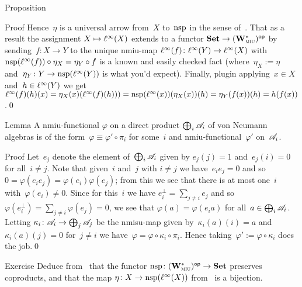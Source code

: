 \documentclass[a]{subfiles}
\begin{document}
\begin{parsec}
\begin{point}{Proposition}
\begin{point}{Proof}
Hence~$\eta$ is a universal arrow from~$X$
to~$\mathrm{nsp}$ in the sense of~.
That as a result the assignment $X\mapsto \ell^\infty(X)$
extends to a functor
$\mathbf{Set}\to{(\mathbf{W}^*_{\text{\textsc{miu}}})}{^{\mathsf{op}}}$
by sending~$f\colon X\to Y$
to the unique nmiu-map $\ell^\infty(f)\colon \ell^\infty(Y)\to\ell^\infty(X)$
with $\mathrm{nsp}(\ell^\infty(f))\circ \eta_X = \eta_Y\circ f$
is a known and easily checked fact
(where~$\eta_X:= \eta$ and~$\eta_Y\colon Y\to\mathrm{nsp}(\ell^\infty(Y))$ 
is what you'd expect).
Finally, plugin applying~$x\in X$ and~$h\in \ell^\infty(Y)$
we get
$ \ell^\infty(f)(h)(x)
= \eta_X(x)(\ell^\infty(f)(h)))
=\mathrm{nsp}(\ell^\infty(x))(\eta_X(x))(h)
=\eta_Y(f(x))(h)
=h(f(x))$.\qed
\end{point}
\end{point}
\begin{point}{Lemma}%
A nmiu-functional $\varphi$
on a direct product $\bigoplus_i \mathscr{A}_i$
of von Neumann algebras
is of the form~$\varphi\equiv \varphi'\circ \pi_i$
for some~$i$ and nmiu-functional~$\varphi'$ on~$\mathscr{A}_i$.
\begin{point}{Proof}%
Let~$e_j$ denote the element of~$\bigoplus_i \mathscr{A}_i$
given by $e_j(j)=1$ and~$e_j(i)=0$ for all~$i\neq j$.
Note that given~$i$ and~$j$ with $i\neq j$
we have~$e_ie_j=0$
and so~$0=\varphi(e_i e_j)=\varphi(e_i)\varphi(e_j)$;
from this we see that
there is at most one~$i$ with~$\varphi(e_i)\neq 0$.
Since for this~$i$
we have $e_i^\perp = \sum_{j\neq i} e_j$
and so~$\varphi(e_i^\perp)=\sum_{j\neq i} \varphi(e_j)=0$,
we see that $\varphi(a)=\varphi(e_i a )$
for all~$a\in \bigoplus_i \mathscr{A}_i$.
Letting  $\kappa_i\colon \mathscr{A}_i\to\bigoplus_j \mathscr{A}_j$
be the nmisu-map given by~$\kappa_i(a)(i)=a$
and~$\kappa_i(a)(j)=0$ for~$j\neq i$
we have~$\varphi = \varphi \circ \kappa_i \circ \pi_i$.
Hence taking~$\varphi':=\varphi\circ \kappa_i$
does the job.\qed
\end{point}
\end{point}
\begin{point}{Exercise}%
Deduce from~
that the functor $\mathrm{nsp}\colon {(\mathbf{W}^*_{\text{\textsc{miu}}})}{^{\mathsf{op}}}\to \mathbf{Set}$
preserves coproducts,
and that the 
map $\eta\colon X\to \mathrm{nsp}(\ell^\infty(X))$
from~ is a bijection.
\end{point}

\end{parsec}
\end{document}
